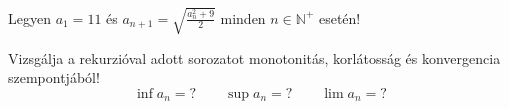 \documentclass[11pt]{scrartcl}
\begin{document}
Legyen $a_1 = 11$ és \(\displaystyle a_{n + 1} = \sqrt{\frac{a_n^2 + 9}{2}}\)
minden $n \in \mathbb{N}^+$ esetén!

Vizsgálja a rekurzióval adott sorozatot monotonitás, korlátosság és
konvergencia szempontjából!
\[
	\inf a_n = ? \qquad \sup a_n = ? \qquad \lim a_n = ?
\]
\end{document}
